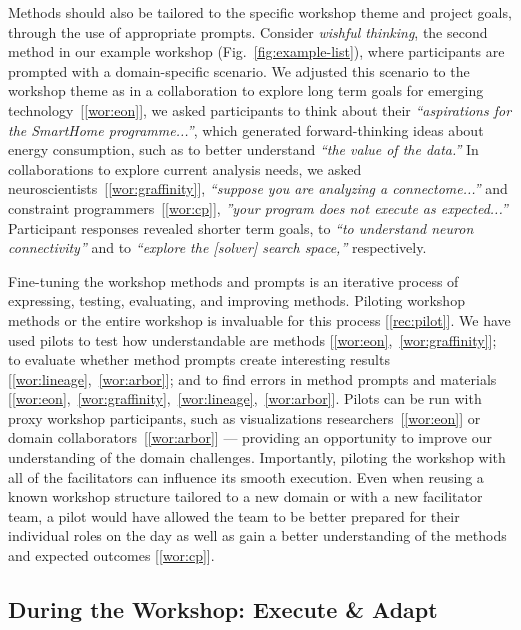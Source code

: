 Methods should also be tailored to the specific workshop theme and project goals, through the use of appropriate prompts. Consider \emph{wishful thinking}, the second method in our example workshop (Fig.~\ref{fig:example-list}), where participants are prompted with a domain-specific scenario. We adjusted this scenario to the workshop theme as in a collaboration to explore long term goals for emerging technology~[\ref{wor:eon}], we asked participants to think about their \emph{``aspirations for the SmartHome programme...''}, which generated forward-thinking ideas about energy consumption, such as to better understand \emph{``the value of the data.''} In collaborations to explore current analysis needs, we asked  neuroscientists~[\ref{wor:graffinity}], \emph{``suppose you are analyzing a connectome...''} and constraint programmers~[\ref{wor:cp}], \emph{''your program does not execute as expected...''} Participant responses revealed shorter term goals, to \emph{``to understand neuron connectivity''} and to \emph{``explore the [solver] search space,''} respectively. 

Fine-tuning the workshop methods and prompts is an iterative process of expressing, testing, evaluating, and improving methods. Piloting workshop methods or the entire workshop is invaluable for this process [\ref{rec:pilot}]. We have used pilots to test how understandable are methods [\ref{wor:eon},~\ref{wor:graffinity}]; to evaluate whether method prompts create interesting results [\ref{wor:lineage},~\ref{wor:arbor}]; and to find errors in method prompts and materials [\ref{wor:eon},~\ref{wor:graffinity},~\ref{wor:lineage},~\ref{wor:arbor}]. Pilots can be run with proxy workshop participants, such as visualizations researchers~[\ref{wor:eon}] or domain collaborators~[\ref{wor:arbor}] --- providing an opportunity to improve our understanding of the domain challenges.  Importantly, piloting the workshop with all of the facilitators can influence its smooth execution. Even when reusing a known workshop structure tailored to a new domain or with a new facilitator team, a pilot would have allowed the team to be better prepared for their individual roles on the day as well as gain a better understanding of the methods and expected outcomes [\ref{wor:cp}].


\subsection{During the Workshop: Execute \& Adapt}

